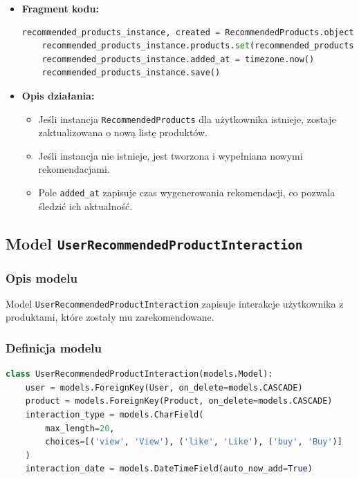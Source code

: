 \documentclass[12pt,a4paper,oneside]{article}
\theoremstyle{definition}
\numberwithin{equation}{section}
\begin{document}
\begin{itemize}
    \item \textbf {Fragment kodu:}
        \begin{lstlisting}[language=Python]
    recommended_products_instance, created = RecommendedProducts.objects.get_or_create(user=user)
    recommended_products_instance.products.set(recommended_products)
    recommended_products_instance.added_at = timezone.now()
    recommended_products_instance.save()
        \end{lstlisting}

    \item \textbf{Opis działania:}
        \begin{itemize}
            \item Jeśli instancja \texttt{RecommendedProducts} dla użytkownika istnieje, zostaje zaktualizowana o nową listę produktów.
            \item Jeśli instancja nie istnieje, jest tworzona i wypełniana nowymi rekomendacjami.
            \item Pole \texttt{added\_at} zapisuje czas wygenerowania rekomendacji, co pozwala śledzić ich aktualność.
        \end{itemize}
\end{itemize}


% 
% 
\clearpage
\subsection{Model \texttt{UserRecommendedProductInteraction}}

\subsubsection{Opis modelu}
Model \texttt{UserRecommendedProductInteraction} zapisuje interakcje użytkownika z produktami, które zostały mu zarekomendowane. 

\subsubsection{Definicja modelu}
\begin{lstlisting}[language=Python, caption={Model \texttt{UserRecommendedProductInteraction}}]
class UserRecommendedProductInteraction(models.Model):
    user = models.ForeignKey(User, on_delete=models.CASCADE)
    product = models.ForeignKey(Product, on_delete=models.CASCADE)
    interaction_type = models.CharField(
        max_length=20,
        choices=[('view', 'View'), ('like', 'Like'), ('buy', 'Buy')]
    )
    interaction_date = models.DateTimeField(auto_now_add=True)
\end{lstlisting}
\end{document}

